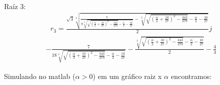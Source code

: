 \documentclass[a4paper,12pt,twoside]{article}
\begin{document}
\\
Raíz  3: 
\begin{align*} \label{r3}
 r_{3} = \frac{\sqrt{3}\sqrt[3]{\frac{7}{9\sqrt[3]{\sqrt{(\frac{\alpha}{2} + \frac{10}{27})^2 - \frac{343}{279}}-\frac{\alpha}{2}-\frac{10}{27}}}-\sqrt[3]{\sqrt{(\frac{\alpha}{2} + \frac{10}{27})^2 - \frac{343}{279}}-\frac{\alpha}{2}-\frac{10}{27}}}}{2}j
 \end{align*}
 \begin{align}
 -\frac{7}{18\sqrt[3]{\sqrt{(\frac{\alpha}{2} + \frac{10}{27})^2 - \frac{343}{279}}-\frac{\alpha}{2}-\frac{10}{27}}}-\frac{ \sqrt[3]{\sqrt{(\frac{\alpha}{2} + \frac{10}{27})^2 - \frac{343}{279}}-\frac{\alpha}{2}-\frac{10}{27}}  }{2}-\frac{4}{3}
\end{align}

 Simulando no matlab ($\alpha > 0$) em um gráfico raiz x $\alpha$ encontramos:
\\
\end{document}
